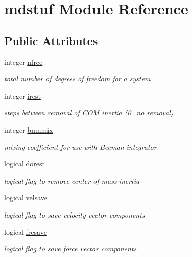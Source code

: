 \hypertarget{classmdstuf}{\section{mdstuf Module Reference}
\label{classmdstuf}
}
\subsection*{Public Attributes}
\begin{DoxyCompactItemize}
\item 
integer \hyperlink{classmdstuf_a83013e704fb5b162d68c4c290c84ee00}{nfree}
\begin{DoxyCompactList}\small\item\em total number of degrees of freedom for a system \end{DoxyCompactList}\item 
integer \hyperlink{classmdstuf_a1dc401f98f77ddfccb057034b6b8a630}{irest}
\begin{DoxyCompactList}\small\item\em steps between removal of C\-O\-M inertia (0=no removal) \end{DoxyCompactList}\item 
integer \hyperlink{classmdstuf_a93d7b9c01fb5b705487ed34d0c4c3849}{bmnmix}
\begin{DoxyCompactList}\small\item\em mixing coefficient for use with Beeman integrator \end{DoxyCompactList}\item 
logical \hyperlink{classmdstuf_a489e81840601f3b7b3f5247681e15cdb}{dorest}
\begin{DoxyCompactList}\small\item\em logical flag to remove center of mass inertia \end{DoxyCompactList}\item 
logical \hyperlink{classmdstuf_a75b87ba4fc2eedf02a7c5951e00eb545}{velsave}
\begin{DoxyCompactList}\small\item\em logical flag to save velocity vector components \end{DoxyCompactList}\item 
logical \hyperlink{classmdstuf_af3b89e8ce75c1382e23281a188302f52}{frcsave}
\begin{DoxyCompactList}\small\item\em logical flag to save force vector components \end{DoxyCompactList}\item 

\end{DoxyCompactItemize}
